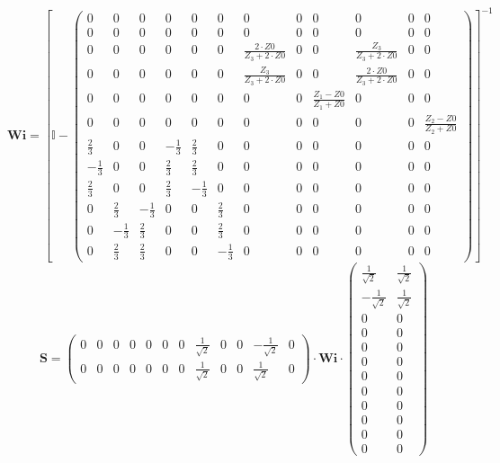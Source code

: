 \[ \mathbf{Wi} =  \left[ \mathbb{I}  - \left(\begin{smallmatrix} 0 & 0
& 0 & 0 & 0 & 0 & 0 & 0 & 0 & 0 & 0 & 0 \\ 0 & 0 & 0 & 0 & 0 & 0 & 0 &
0 & 0 & 0 & 0 & 0 \\ 0 & 0 & 0 & 0 & 0 & 0 & \frac{2\cdot
Z0}{Z_3+2\cdot Z0} & 0 & 0 & \frac{Z_3}{Z_3+2\cdot Z0} & 0 & 0 \\ 0 &
0 & 0 & 0 & 0 & 0 & \frac{Z_3}{Z_3+2\cdot Z0} & 0 & 0 & \frac{2\cdot
Z0}{Z_3+2\cdot Z0} & 0 & 0 \\ 0 & 0 & 0 & 0 & 0 & 0 & 0 & 0 & \frac{
Z_1 -Z0}{ Z_1 +Z0} & 0 & 0 & 0 \\ 0 & 0 & 0 & 0 & 0 & 0 & 0 & 0 & 0 &
0 & 0 & \frac{ Z_2 -Z0}{ Z_2 +Z0} \\ \frac{2}{3} & 0 & 0 &
-\frac{1}{3} & \frac{2}{3} & 0 & 0 & 0 & 0 & 0 & 0 & 0 \\ -\frac{1}{3}
& 0 & 0 & \frac{2}{3} & \frac{2}{3} & 0 & 0 & 0 & 0 & 0 & 0 & 0 \\
\frac{2}{3} & 0 & 0 & \frac{2}{3} & -\frac{1}{3} & 0 & 0 & 0 & 0 & 0 &
0 & 0 \\ 0 & \frac{2}{3} & -\frac{1}{3} & 0 & 0 & \frac{2}{3} & 0 & 0
& 0 & 0 & 0 & 0 \\ 0 & -\frac{1}{3} & \frac{2}{3} & 0 & 0 &
\frac{2}{3} & 0 & 0 & 0 & 0 & 0 & 0 \\ 0 & \frac{2}{3} & \frac{2}{3} &
0 & 0 & -\frac{1}{3} & 0 & 0 & 0 & 0 & 0 & 0 \end{smallmatrix}\right)
\right]^{-1}  \]
\[ \mathbf{S} = \left(\begin{smallmatrix} 0 & 0 & 0 & 0 & 0 & 0 & 0 &
\frac{1}{\sqrt{2}} & 0 & 0 & -\frac{1}{\sqrt{2}} & 0 \\ 0 & 0 & 0 & 0
& 0 & 0 & 0 & \frac{1}{\sqrt{2}} & 0 & 0 & \frac{1}{\sqrt{2}} & 0
\end{smallmatrix}\right) \cdot \mathbf{Wi}
\cdot\left(\begin{smallmatrix} \frac{1}{\sqrt{2}} & \frac{1}{\sqrt{2}}
\\ -\frac{1}{\sqrt{2}} & \frac{1}{\sqrt{2}} \\ 0 & 0 \\ 0 & 0 \\ 0 & 0
\\ 0 & 0 \\ 0 & 0 \\ 0 & 0 \\ 0 & 0 \\ 0 & 0 \\ 0 & 0 \\ 0 & 0
\end{smallmatrix}\right) \]
